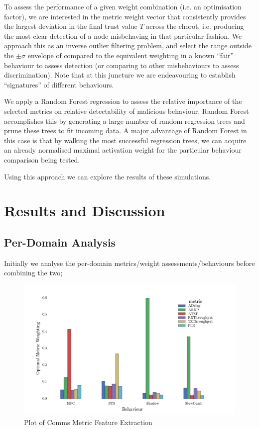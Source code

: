 \documentclass{aamas2016}
\begin{document}
To assess the performance of a given weight combination (i.e. an optimisation factor), we are interested in the metric weight vector that consistently provides the largest deviation in the final trust value $T$ across the chorot, i.e. producing the most clear detection of a node misbehaving in that particular fashion.
We approach this as an inverse outlier filtering problem, and select the range outside the $\pm\sigma$ envelope of compared to the equivalent weighting in a known ``fair'' behaviour to assess detection (or comparing to other misbehaviours to assess discrimination). Note that at this juncture we are endeavouring to establish ``signatures'' of different behaviours.

We apply a Random Forest regression \cite{Breiman2001} to assess the relative importance of the selected metrics on relative detectability of malicious behaviour. 
Random Forest accomplishes this by generating a large number of random regression trees and prune these trees to fit incoming data. A major advantage of Random Forest in this case is that by walking the most successful regression trees, we can acquire an already normalised maximal activation weight for the particular behaviour comparison being tested.

Using this approach we can explore the results of these simulations.

\section{Results and Discussion}

\subsection{Per-Domain Analysis}

Initially we analyse the per-domain metrics/weight assessments/behaviours before combining the two; 

\begin{figure}[h]
	\centering
  \includegraphics[width=\linewidth]{comms_metric_trust_relevance}
	\caption{Plot of Comms Metric Feature Extraction}
	\label{fig:comms_feature_extraction}
\end{figure}
\end{document}
